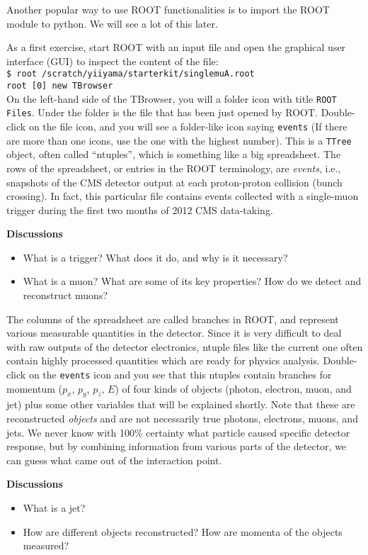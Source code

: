 \documentclass[12pt]{article}
\newcommand{\terminal}[1]{\vspace{3pt}\texttt{\$ #1} \\}
\newcommand{\rterminal}[2]{\vspace{3pt}\texttt{root [#1] #2} \\}
\newenvironment{discussions}{%
\vspace{0.2in}%
\textbf{Discussions}%
\begin{itemize}%
}{%
\end{itemize}%
}
\begin{document}
Another popular way to use ROOT functionalities is to import the ROOT module to python. We will see a lot of this later.

As a first exercise, start ROOT with an input file and open the graphical user interface (GUI) to inspect the content of the file: \\
\terminal{root /scratch/yiiyama/starterkit/singlemuA.root}
\rterminal{0}{new TBrowser}
On the left-hand side of the TBrowser, you will a folder icon with title \texttt{ROOT Files}. Under the folder is the file that has been just opened by ROOT. Double-click on the file icon, and you will see a folder-like icon saying \texttt{events} (If there are more than one icons, use the one with the highest number). This is a \texttt{TTree} object, often called ``ntuples'', which is something like a big spreadsheet. The rows of the spreadsheet, or entries in the ROOT terminology, are \textit{events}, i.e., snapshots of the CMS detector output at each proton-proton collision (bunch crossing). In fact, this particular file contains events collected with a single-muon trigger during the first two months of 2012 CMS data-taking.

\begin{discussions}
\item What is a trigger? What does it do, and why is it necessary?
\item What is a muon? What are some of its key properties? How do we detect and reconstruct muons?
\end{discussions}

The columns of the spreadsheet are called branches in ROOT, and represent various measurable quantities in the detector. Since it is very difficult to deal with raw outputs of the detector electronics, ntuple files like the current one often contain highly processed quantities which are ready for physics analysis. Double-click on the \texttt{events} icon and you see that this ntuples contain branches for momentum ($p_{x}$, $p_{y}$, $p_{z}$, $E$) of four kinds of objects (photon, electron, muon, and jet) plus some other variables that will be explained shortly. Note that these are reconstructed \textit{objects} and are not necessarily true photons, electrons, muons, and jets. We never know with 100\% certainty what particle caused specific detector response, but by combining information from various parts of the detector, we can guess what came out of the interaction point.

\begin{discussions}
\item What is a jet?
\item How are different objects reconstructed? How are momenta of the objects measured?
\end{discussions}
\end{document}
